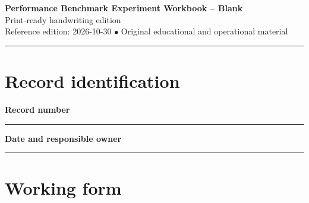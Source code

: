 \documentclass[10pt,letterpaper]{article}
\begin{document}
\begin{center}
{\LARGE\bfseries\color{cdblue}Performance Benchmark Experiment Workbook -- Blank}\\[7pt]
{\large Print-ready handwriting edition}\\[6pt]
{\small Reference edition: 2026-10-30 $\bullet$ Original educational and operational material}
\end{center}
\noindent\color{cdblue}\rule{\linewidth}{1.2pt}\color{black}
\vspace{0.4em}
\section{Record identification}
\textbf{Record number}\par
\noindent\rule{\linewidth}{0.35pt}\par\vspace{0.7em}
\textbf{Date and responsible owner}\par
\noindent\rule{\linewidth}{0.35pt}\par\vspace{0.7em}

\section{Working form}
\end{document}
